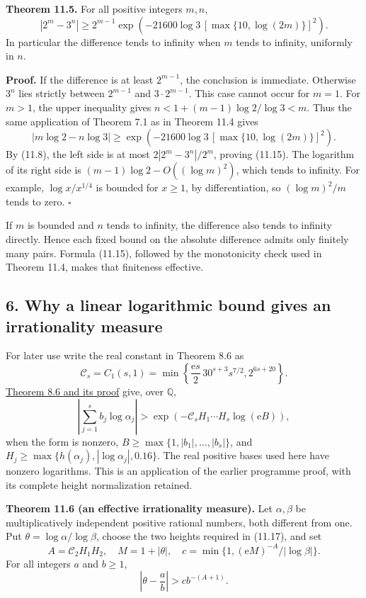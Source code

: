 \documentclass[
  11pt,
  a4paper,
]{article}
\begin{document}
\textbf{Theorem 11.5.} For all positive integers \(m,n\), \[
|2^m-3^n|\ge 2^{m-1}
\exp\!\left(-21600\log3\,[\max\{10,\log(2m)\}]^2\right).
\tag{11.15}
\] In particular the difference tends to infinity when \(m\) tends to
infinity, uniformly in \(n\).

\textbf{Proof.} If the difference is at least \(2^{m-1}\), the
conclusion is immediate. Otherwise \(3^n\) lies strictly between
\(2^{m-1}\) and \(3\cdot2^{m-1}\). This case cannot occur for \(m=1\).
For \(m>1\), the upper inequality gives \(n<1+(m-1)\log2/\log3<m\). Thus
the same application of Theorem 7.1 as in Theorem 11.4 gives \[
|m\log2-n\log3|\ge
\exp\!\left(-21600\log3\,[\max\{10,\log(2m)\}]^2\right).
\] By (11.8), the left side is at most \(2|2^m-3^n|/2^m\), proving
(11.15). The logarithm of its right side is
\((m-1)\log2-O((\log m)^2)\), which tends to infinity. For example,
\(\log x/x^{1/4}\) is bounded for \(x\ge1\), by differentiation, so
\((\log m)^2/m\) tends to zero. \(\square\)

If \(m\) is bounded and \(n\) tends to infinity, the difference also
tends to infinity directly. Hence each fixed bound on the absolute
difference admits only finitely many pairs. Formula (11.15), followed by
the monotonicity check used in Theorem 11.4, makes that finiteness
effective.

\subsection{6. Why a linear logarithmic bound gives an irrationality
measure}\label{why-a-linear-logarithmic-bound-gives-an-irrationality-measure}

For later use write the real constant in Theorem 8.6 as \[
\mathcal C_s=C_1(s,1)
=\min\left\{\frac{\mathrm e s}{2}\,30^{s+3}s^{7/2},
                     2^{6s+20}\right\}.
\tag{11.16}
\] \href{https://kokunoyumeto.github.io/open-math-courses-public/courses/TR-BAKER/TR-BAKER-08.html\#4-matveev-s-homogeneous-estimate}{Theorem
8.6 and its proof} give, over \(\mathbb Q\), \[
\left|\sum_{j=1}^s b_j\log\alpha_j\right|>\exp(-\mathcal C_s H_1\cdots H_s\log(\mathrm e B)),
\tag{11.17}
\] when the form is nonzero, \(B\ge\max\{1,|b_1|,\ldots,|b_s|\}\), and
\(H_j\ge\max\{h(\alpha_j),|\log\alpha_j|,0.16\}\). The real positive
bases used here have nonzero logarithms. This is an application of the
earlier programme proof, with its complete height normalization
retained.

\textbf{Theorem 11.6 (an effective irrationality measure).} Let
\(\alpha,\beta\) be multiplicatively independent positive rational
numbers, both different from one. Put \(\theta=\log\alpha/\log\beta\),
choose the two heights required in (11.17), and set \[
A=\mathcal C_2H_1H_2,\quad M=1+|\theta|,\quad
c=\min\{1,(\mathrm e M)^{-A}/|\log\beta|\}.
\] For all integers \(a\) and \(b\ge1\), \[
\left|\theta-\frac ab\right|>c b^{-(A+1)}.
\tag{11.18}
\]
\end{document}
